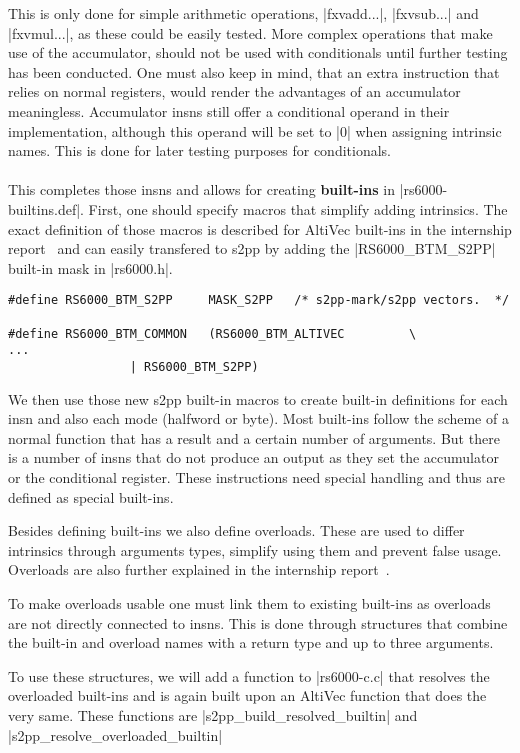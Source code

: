 This is only done for simple arithmetic operations, |fxvadd...|, |fxvsub...| and |fxvmul...|, as these could be easily tested.
More complex operations that make use of the accumulator, should not be used with conditionals until further testing has been conducted.
One must also keep in mind, that an extra instruction that relies on normal registers, would render the advantages of an accumulator meaningless.
Accumulator insns still offer a conditional operand in their implementation, although this operand will be set to |0| when assigning intrinsic names.
This is done for later testing purposes for conditionals.
\\
\\
This completes those insns and allows for creating \textbf{built-ins} in |rs6000-builtins.def|.
First, one should specify macros that simplify adding intrinsics.
The exact definition of those macros is described for AltiVec built-ins in the internship report~\citep{heimbrecht_2017internship} and can easily transfered to \ac{s2pp} by adding the |RS6000_BTM_S2PP| built-in mask in |rs6000.h|.
\begin{lstlisting}
#define RS6000_BTM_S2PP     MASK_S2PP   /* s2pp-mark/s2pp vectors.  */

#define RS6000_BTM_COMMON   (RS6000_BTM_ALTIVEC         \
...
                 | RS6000_BTM_S2PP)
\end{lstlisting}

We then use those new s2pp built-in macros to create built-in definitions for each insn and also each mode (halfword or byte).
Most built-ins follow the scheme of a normal function that has a result and a certain number of arguments.
But there is a number of insns that do not produce an output as they set the accumulator or the conditional register.
These instructions need special handling and thus are defined as special built-ins.

Besides defining built-ins we also define overloads.
These are used to differ intrinsics through arguments types, simplify using them and prevent false usage.
Overloads are also further explained in the internship report~\citep{heimbrecht_2017internship}.

To make overloads usable one must link them to existing built-ins as overloads are not directly connected to insns.
This is done through structures that combine the built-in and overload names with a return type and up to three arguments.

To use these structures, we will add a function to |rs6000-c.c| that resolves the overloaded built-ins and is again built upon an AltiVec function that does the very same.
These functions are |s2pp_build_resolved_builtin| and |s2pp_resolve_overloaded_builtin|


